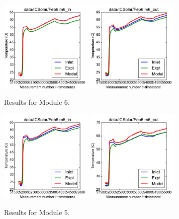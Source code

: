 \documentclass{article}
\begin{document}
\begin{figure}[!ht]
\centering
\includegraphics[width=0.4\textwidth]{../../data/ICSolar/images/Feb6_m6_in_unsteady.pdf}\hspace{0.05\textwidth}
\includegraphics[width=0.4\textwidth]{../../data/ICSolar/images/Feb6_m6_out_unsteady.pdf}\hspace{0.05\textwidth}\\
\caption{Results for Module 6.}\end{figure}
\begin{figure}[!ht]
\centering
\includegraphics[width=0.4\textwidth]{../../data/ICSolar/images/Feb6_m5_in_unsteady.pdf}\hspace{0.05\textwidth}
\includegraphics[width=0.4\textwidth]{../../data/ICSolar/images/Feb6_m5_out_unsteady.pdf}\hspace{0.05\textwidth}\\
\caption{Results for Module 5.}\end{figure}
\end{document}
